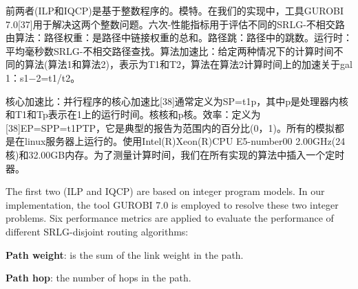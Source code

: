 前两者(ILP和IQCP)是基于整数程序的。模特。在我们的实现中，工具GUROBI 7.0[37]用于解决这两个整数问题。六次-性能指标用于评估不同的SRLG-不相交路由算法：路径权重：是路径中链接权重的总和。路径跳：路径中的跳数。运行时：平均毫秒数SRLG-不相交路径查找。算法加速比：给定两种情况下的计算时间不同的算法(算法1和算法2)，表示为T1和T2，算法在算法2计算时间上的加速关于gal 1：s1−2=t1/t2。


核心加速比：并行程序的核心加速比[38]通常定义为SP=t1p，其中p是处理器内核和T1和Tp表示在1上的运行时间。核核和p核。效率：定义为[38]EP=SPP=t1PTP，它是典型的报告为范围内的百分比(0，1)。所有的模拟都是在linux服务器上运行的。使用Intel(R)Xeon(R)CPU E5-number00 2.00GHz(24核)和32.00GB内存。为了测量计算时间，我们在所有实现的算法中插入一个定时器。


The first two (ILP and IQCP) are based on integer program models. In our implementation, the tool GUROBI 7.0 \cite{optimization2012gurobi} is employed to resolve these two integer problems.  Six performance metrics are applied to evaluate the performance of different SRLG-disjoint routing algorithms:
%
%

\textbf{Path weight}: is the sum of the link weight in the path.


 \textbf{Path hop}: the number of hops in the path.

